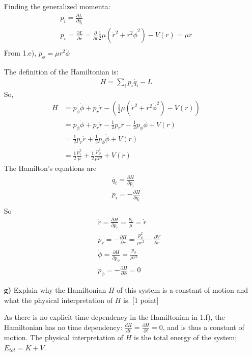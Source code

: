 \documentclass[11pt,a4paper]{report}
\newcounter{excount}[chapter]
\newenvironment{exercise}[1][]{\addtocounter{excount}{1} \noindent {\bf Question
    \arabic{excount} \ \ #1}\hspace{2mm}}{\vspace{4mm}}
\begin{document}
\begin{exercise}{\bf Central potentials\\}
\begin{itemize}
Finding the generalized momenta: 
\begin{align}
p_i=\frac{\partial L}{\partial \dot{q_i}} \\
p_r=\frac{\partial L}{\partial \dot{r}}=\frac{\partial}{\partial t}\frac{1}{2}\mu (\dot{r}^2+r^2\dot{\phi}^2)-V(r) = \mu \dot{r}\\
\end{align}
From 1.e), $p_{\phi}=\mu r^2 \dot{\phi}$ \par 
The definition of the Hamiltonian is:
\begin{align*}
H=\sum_i p_i \dot{q_i}-L
\end{align*}
So,
\begin{align}
H&= p_{\phi} \dot{\phi} + p_r\dot{r}-(\frac{1}{2}\mu (\dot{r}^2+r^2\dot{\phi}^2)-V(r))\\
&= p_{\phi} \dot{\phi} + p_r\dot{r}-\frac{1}{2} p_r \dot{r} -\frac{1}{2}p_\phi \dot{\phi}   +V(r) \\
&= \frac{1}{2} p_r \dot{r} +\frac{1}{2}p_\phi \dot{\phi}   +V(r)\\
&=  \frac{1}{2} \frac{p_r^2}{\mu}  +\frac{1}{2}\frac{p_\phi^2}{\mu r^2}    +V(r) \label{eq:H1}
\end{align}
The Hamilton's equations are
\begin{align*}
\dot{q_i}=\frac{\partial H}{\partial p_i} \\
\dot{p_i}=-\frac{\partial H}{\partial q_i} \\
\end{align*}
So 
\begin{align}
&\dot{r}=\frac{\partial H}{\partial p_r}=\frac{p_r}{\mu}=\dot{r} \\
&\dot{p_r}=-\frac{\partial H}{\partial r}=\frac{p_\phi^2}{\mu r^3}-\frac{\partial V}{\partial r} \\
&\dot{\phi}=\frac{\partial H}{\partial p_\phi} =\frac{p_\phi}{\mu r^2}\\
&\dot{p_\phi}=-\frac{\partial H}{\partial \phi}=0 
\end{align}
\item[{\bf g)}] Explain why the Hamiltonian $H$ of this system is a constant of motion and what the physical interpretation of $H$ is. [1 point] \par 

As there is no explicit time dependency in the Hamiltonian in 1.f), the Hamiltonian has no time dependency: $\frac{dH}{dt}=\frac{\partial H}{\partial t}=0$, and is thus a constant of motion. The physical interpretation of $H$ is the total energy of the system; $E_{tot}=K+V$.
\end{itemize}
\end{exercise}
\end{document}
